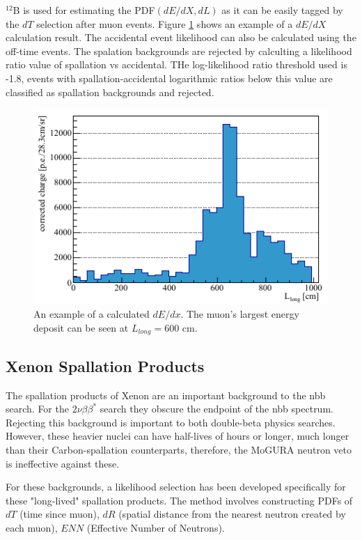 $^{12}$B is used for estimating the PDF$(dE/dX,dL)$ as it can be easily tagged by the $dT$ selection after muon events. Figure \ref{fig:shower_pdf} shows an example of a $dE/dX$ calculation result. The accidental event likelihood can also be calculated using the off-time events. The spalation backgrounds are rejected by calculting a likelihood ratio value of spallation vs accidental. THe log-likelihood ratio threshold used is -1.8, events with spallation-accidental logarithmic ratios below this value are classified as spallation backgrounds and rejected.

\begin{figure}[htb]
	\centering
	\includegraphics[scale=0.75]{shower_dedx.png}
	\caption{An example of a calculated $dE/dx$. The muon's largest energy deposit can be seen at $L_{long}=600$ cm.}
	\label{fig:shower_pdf}
\end{figure}

\subsection{Xenon Spallation Products}
The spallation products of Xenon are an important background to the \0nbb search. For the $2\nu\beta\beta^*$ search they obscure the endpoint of the \2nbb spectrum. Rejecting this background is important to both double-beta physics searches. However, these heavier nuclei can have half-lives of hours or longer, much longer than their Carbon-spallation counterparts, therefore, the MoGURA neutron veto is ineffective against these. 

For these backgrounds, a likelihood selection has been developed specifically for these "long-lived" spallation products. The method involves constructing PDFs of $dT$ (time since muon), $dR$ (spatial distance from the nearest neutron created by each muon), $ENN$ (Effective Number of Neutrons).


